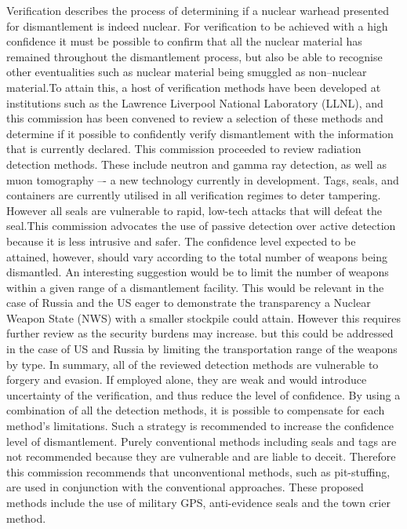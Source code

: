 \documentclass[twoside,titlepage,11pt,twocolumn,a4paper]{article}
\begin{document}
Verification describes the process of determining if a nuclear warhead 
presented for dismantlement is indeed nuclear. For verification to be 
achieved with a high confidence it must be possible to confirm that all
the nuclear material has remained throughout the dismantlement process,
but also be able to recognise other eventualities such as nuclear material
being smuggled as non–nuclear material.To attain this, a host of verification
methods have been developed at institutions such as the Lawrence Liverpool 
National Laboratory (LLNL), and this commission has been convened to review 
a selection of these methods and determine if it possible to confidently 
verify dismantlement with the information that is currently declared.
This commission proceeded to review radiation detection methods. These include 
neutron and gamma ray detection, as well as muon tomography –- a new technology 
currently in development. Tags, seals, and containers are currently utilised in
all verification regimes to deter tampering. However all seals are vulnerable to 
rapid, low-tech attacks that will defeat the seal.This commission advocates the 
use of passive detection over active detection because it is less intrusive and safer.
The confidence level expected to be attained, however, should vary according to the total
number of weapons being dismantled. An interesting suggestion would be to limit the number
of weapons within a given range of a dismantlement facility. This would be relevant in the 
case of Russia and the US eager to demonstrate the transparency a Nuclear Weapon State (NWS)
with a smaller stockpile could attain. However this requires further review as the security
burdens may increase. but this could be addressed in the case of US and Russia by limiting the
transportation range of the weapons by type. In summary, all of the reviewed detection methods
are vulnerable to forgery and evasion. If employed alone, they are weak and would introduce 
uncertainty of the verification, and thus reduce the level of confidence. By using a combination 
of all the detection methods, it is possible to compensate for each method’s
limitations. Such a strategy is recommended to increase the confidence level of dismantlement.
Purely conventional methods including seals and tags are not recommended because they are vulnerable
and are liable to deceit. Therefore this commission recommends that unconventional methods, such as 
pit-stuffing, are used in conjunction with the conventional approaches. These proposed methods 
include the use of military GPS, anti-evidence seals and the town crier method.
\end{document}
